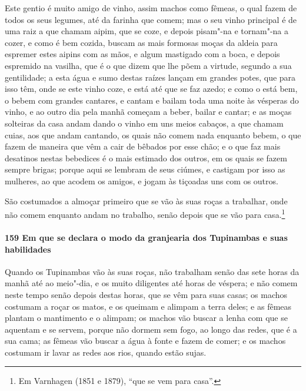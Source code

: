 Este gentio é muito amigo de vinho, assim machos como fêmeas, o qual fazem de todos os
seus legumes, até da farinha que comem; mas o seu vinho principal é de uma raiz a que
chamam aipim, que se coze, e depois pisam"-na e tornam"-na a cozer, e como é bem cozida,
buscam as mais formosas moças da aldeia para espremer estes aipins com as mãos, e algum
mastigado com a boca, e depois espremido na vasilha, que é o que dizem que lhe põem a
virtude, segundo a sua gentilidade; a esta água e sumo destas raízes lançam em grandes
potes, que para isso têm, onde se este vinho coze, e está até que se faz azedo; e como o
está bem, o bebem com grandes cantares, e cantam e bailam toda uma noite às vésperas do
vinho, e ao outro dia pela manhã começam a beber, bailar e cantar; e as moças solteiras da
casa andam dando o vinho em uns meios cabaços, a que chamam cuias, aos que andam cantando,
os quais não comem nada enquanto bebem, o que fazem de maneira que vêm a cair de bêbados
por esse chão; e o que faz mais desatinos nestas bebedices é o mais estimado dos outros,
em os quais se fazem sempre brigas; porque aqui se lembram de seus ciúmes, e castigam por
isso as mulheres, ao que acodem os amigos, e jogam às tiçoadas uns com os outros.

São costumados a almoçar primeiro que se vão às suas roças a trabalhar, onde não comem
enquanto andam no trabalho, senão depois que se vão para casa.\footnote{ Em Varnhagen
(1851 e 1879), ``que se vem para casa''.}

\paragraph{159 Em que se declara o modo da granjearia dos Tupinambas e suas habilidades}

Quando os Tupinambas vão às suas roças, não trabalham senão das sete horas da manhã até ao
meio"-dia, e os muito diligentes até horas de véspera; e não comem neste tempo senão depois
destas horas, que se vêm para suas casas; os machos costumam a roçar os matos, e os
queimam e alimpam a terra deles; e as fêmeas plantam o mantimento e o alimpam; os machos
vão buscar a lenha com que se aquentam e se servem, porque não dormem sem fogo, ao longo
das redes, que é a sua cama; as fêmeas vão buscar a água à fonte e fazem de comer; e os
machos costumam ir lavar as redes aos rios, quando estão sujas.

